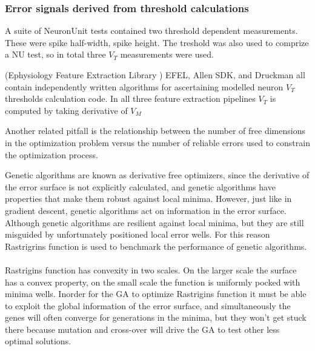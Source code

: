     \subsubsection{Error signals derived from threshold calculations}
    A suite of NeuronUnit tests contained two threshold dependent measurements. These were spike half-width, spike height. The treshold was also used to comprize a NU test, so in total three $V_{T}$ measurements were used.
    
    (Ephysiology Feature Extraction Library \cite{EFEL}) EFEL, Allen SDK, and Druckman all contain independently written algorithms for ascertaining modelled neuron $V_{T}$ thresholds calculation code. In all three feature extraction pipelines $V_{T}$ is computed by taking derivative of $V_{M}$
    
   Another related pitfall is the relationship between the number of free dimensions in the optimization problem versus the number of reliable errors used to constrain the optimization process.
   
   Genetic algorithms are known as derivative free optimizers, since the derivative of the error surface is not explicitly calculated, and genetic algorithms have properties that make them robust against local minima. However, just like in gradient descent, genetic algorithms act on information in the error surface. Although genetic algorithms are resilient against local minima, but they are still misguided by unfortunately positioned local error wells. For this reason Rastrigrins function is used to benchmark the performance of genetic algorithms.\\
   \\
   Rastrigins function has convexity in two scales. On the larger scale the surface has a convex property, on the small scale the function is uniformly pocked with minima wells. Inorder for the GA to optimize Rastrigins function it must be able to exploit the global information of the error surface, and simultaneously the genes will often converge for generations in the minima, but they won't get stuck there because mutation and cross-over will drive the GA to test other less optimal solutions.\\
   \\
   
